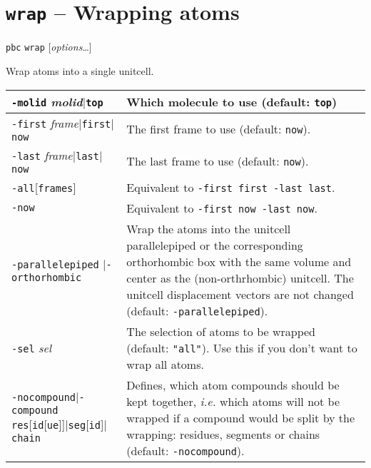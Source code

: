 \documentclass[a4paper, DIV12]{scrartcl}
\newcommand{\ie}{\emph{i.e.}\xspace}
\begin{document}
\newpage
\section{\texttt{wrap} -- Wrapping atoms}
\label{sec:wrap}


\texttt{pbc} \texttt{wrap} [\textit{options}\dots]


Wrap atoms into a single unitcell.


\begin{tabular}{|p{}|p{}|}
\hline

\texttt{-molid} \textit{molid}$|$\texttt{top}
& Which molecule to use (default: \texttt{top})
\\ \hline

\texttt{-first} \textit{frame}$|$\texttt{first}$|$\texttt{now}
& The first frame to use (default: \texttt{now}).
\\ \hline

\texttt{-last} \textit{frame}$|$\texttt{last}$|$\texttt{now}
& The last frame to use (default: \texttt{now}).
\\ \hline

\texttt{-all}[\texttt{frames}]
& Equivalent to \texttt{-first first -last last}.
\\ \hline

\texttt{-now}
& Equivalent to \texttt{-first now -last now}.
\\ \hline

\texttt{-parallelepiped} $|$\texttt{-orthorhombic}
& Wrap the atoms into the unitcell parallelepiped or the corresponding
orthorhombic box with the same volume and center as the
(non-orthrhombic) unitcell. The unitcell displacement vectors are not
changed (default: \texttt{-parallelepiped}).
\\ \hline

\texttt{-sel} \textit{sel}
& The selection of atoms to be wrapped (default: \texttt{"all"}). Use
this if you don't want to wrap all atoms.
\\ \hline

\texttt{-nocompound}\linebreak $|$\texttt{-compound} \texttt{res}[\texttt{id}[\texttt{ue}]]$|$\texttt{seg}[\texttt{id}]$|$\texttt{chain}
& Defines, which atom compounds should be kept together, \ie which
atoms will not be wrapped if a compound would be split by the
wrapping: residues, segments or chains (default:
\texttt{-nocompound}).
\\ \hline


\end{tabular}
\end{document}
